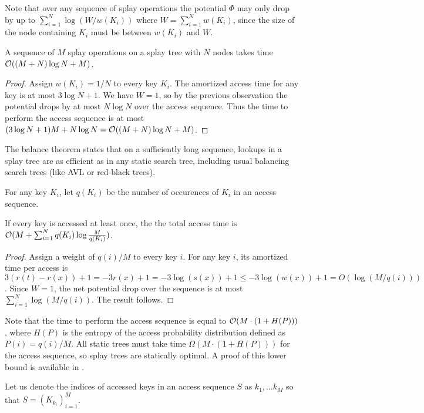 Note that over any sequence of splay operations
the potential $\Phi$ may only drop by up to $\sum_{i=1}^N \log(W/w(K_i))$
where $W=\sum_{i=1}^N w(K_i)$, since the size of the node containing $K_i$
must be between $w(K_i)$ and $W$.

\begin{theorem}
A sequence of $M$ splay operations on a splay tree with $N$ nodes takes time
$\mathcal{O}((M+N)\log N+M)$.
\end{theorem}
\begin{proof}
Assign $w(K_i)=1/N$ to every key $K_i$. The amortized
access time for any key is at most $3\log N+1$. We have $W=1$, so by
the previous observation the potential drops by at most $N\log N$ over
the access sequence. Thus the time to perform the access sequence is at most
$(3\log N+1)M + N\log N = \mathcal{O}((M+N)\log N + M)$.
\end{proof}

The balance theorem states that on a sufficiently long sequence, lookups in
a splay tree are as efficient as in any static search tree, including
usual balancing search trees (like AVL or red-black trees).

For any key $K_i$, let $q(K_i)$ be the number of occurences of $K_i$
in an access sequence.
\begin{theorem}
If every key is accessed at least once, the the total access time is
$\mathcal{O}(M + \sum_{i=1}^N q(K_i)\log\frac{M}{q(K_i)})$.
\end{theorem}
\begin{proof}
Assign a weight of $q(i)/M$ to every key $i$. For any key $i$, its
amortized time per access is $3(r(t)-r(x))+1=-3r(x)+1=-3\log(s(x))+1\leq
	-3\log(w(x))+1=O(\log(M/q(i)))$.
Since $W=1$, the net potential drop over the sequence is at most
$\sum_{i=1}^{N}\log(M/q(i))$. The result follows.
\end{proof}

Note that the time to perform the access sequence is equal to
$\mathcal{O}(M \cdot (1 + H(P)))$, where $H(P)$ is the entropy of the access probability
distribution defined as $P(i)=q(i)/M$. All static trees must take time
$\Omega(M\cdot (1+H(P)))$ for the access sequence, so splay trees are statically
optimal. A proof of this lower bound is available in \cite{information-theory}.

Let us denote the indices of accessed keys in an access sequence $S$ as
$k_1, \ldots k_M$ so that $S=(K_{k_i})_{i=1}^M$.

